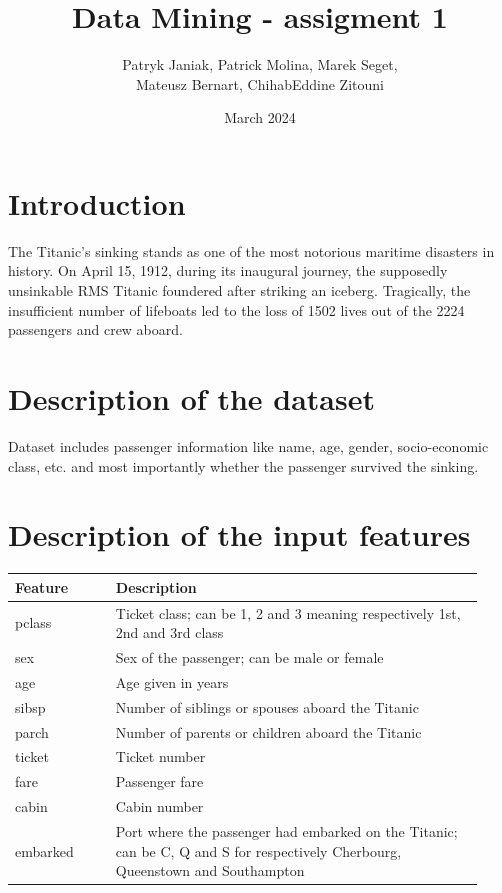 \documentclass{article}
\title{Data Mining - assigment 1}
\author{Patryk Janiak, Patrick Molina, Marek Seget, \\ Mateusz Bernart, ChihabEddine Zitouni}
\date{March 2024}
\begin{document}
\maketitle

\section{Introduction}

The Titanic's sinking stands as one of the most notorious maritime disasters in history. On April 15, 1912, during its inaugural journey, the supposedly unsinkable RMS Titanic foundered after striking an iceberg. Tragically, the insufficient number of lifeboats led to the loss of 1502 lives out of the 2224 passengers and crew aboard.

\section{Description of the dataset}

Dataset includes passenger information like name, age, gender, socio-economic class, etc. and most importantly whether the passenger survived the sinking. 

\section{Description of the input features}

\begin{table}[H]
\begin{tabular}{p{0.2\linewidth} | p{0.73\linewidth}}
\hline
Feature  & Description \\
\hline
pclass   & Ticket class; can be 1, 2 and 3 meaning respectively 1st, 2nd and 3rd class \\
sex      & Sex of the passenger; can be male or female \\
age      & Age given in years \\
sibsp    & Number of siblings or spouses aboard the Titanic \\
parch    & Number of parents or children aboard the Titanic \\
ticket   & Ticket number \\
fare     & Passenger fare \\
cabin    & Cabin number \\
embarked & Port where the passenger had embarked on the Titanic; can be C, Q and S for respectively Cherbourg, Queenstown and Southampton \\
\hline
\end{tabular}
\end{table}
\end{document}
